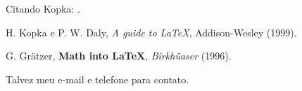 \documentclass[a4paper,12pt]{article}
\begin{document}
	
	Citando Kopka: \cite{Kopka:1999}.
	
	\begin{thebibliography}{+}
	
	    H. Kopka e P. W. Daly,      %
	    \textsl{A guide to \LaTeX}, %
	    Addison-Wesley              %
	    (1999).                     %
	    
	   	G. Grätzer,                 %
	   	\textbf{Math into \LaTeX},  %
	   	\textit{Birkhüaser}         %
	   	(1996).                     %
	   	
			Talvez meu e-mail e telefone para contato.
			
	\end{thebibliography}	

	
	
	
	
	
	
\end{document}
